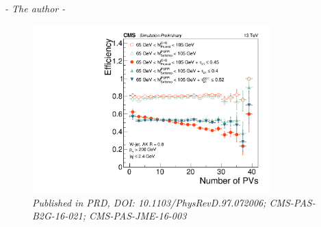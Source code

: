 \begin{flushright} \textit{- The author - } \end{flushright}
\begin{figure}[h!]
    \centering
     \vspace*{10mm}
    \includegraphics[height=6.5cm]{figures/vtagging/JME-16-003/BoostedW/WtagSigEffvsNPV.pdf}
    \vspace*{10mm}
    \caption*{\footnotesize{\textit{Published in PRD, DOI: 10.1103/PhysRevD.97.072006; CMS-PAS-B2G-16-021; CMS-PAS-JME-16-003}}}
\end{figure}
\vspace*{\fill}

\clearpage

\clearpage

